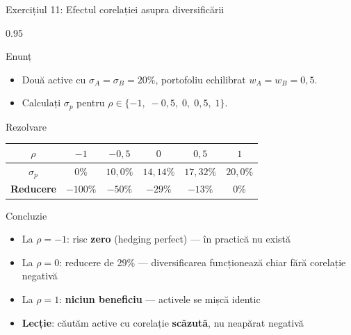 \documentclass[9pt, aspectratio=169, t]{beamer}
\begin{document}
\begin{frame}[shrink=10]{Exercițiul 11: Efectul corelației asupra diversificării}
    \begin{cminipage}{0.95\textwidth}
    \begin{block}{Enunț}
    \begin{itemize}\setlength{\itemsep}{0pt}
        \item Două active cu $\sigma_A = \sigma_B = 20\%$, portofoliu echilibrat $w_A = w_B = 0{,}5$.
        \item Calculați $\sigma_p$ pentru $\rho \in \{-1,\; -0{,}5,\; 0,\; 0{,}5,\; 1\}$.
    \end{itemize}
    \end{block}
    \vspace{0.1cm}
    \begin{exampleblock}{Rezolvare}
    \begin{center}
    {\small\renewcommand{\arraystretch}{1.2}
    \begin{tabular}{cccccc}
    \toprule
    $\rho$ & $-1$ & $-0{,}5$ & $0$ & $0{,}5$ & $1$ \\
    \midrule
    $\sigma_p$ & $0\%$ & $10{,}0\%$ & $14{,}14\%$ & $17{,}32\%$ & $20{,}0\%$ \\
    \textbf{Reducere} & $-100\%$ & $-50\%$ & $-29\%$ & $-13\%$ & $0\%$ \\
    \bottomrule
    \end{tabular}}
    \end{center}
    \end{exampleblock}
    \begin{alertblock}{Concluzie}
    \begin{itemize}\setlength{\itemsep}{0pt}
        \item La $\rho = -1$: risc \textbf{zero} (hedging perfect) --- în practică nu există
        \item La $\rho = 0$: reducere de 29\% --- diversificarea funcționează chiar fără corelație negativă
        \item La $\rho = 1$: \textbf{niciun beneficiu} --- activele se mișcă identic
        \item \textbf{Lecție}: căutăm active cu corelație \textbf{scăzută}, nu neapărat negativă
    \end{itemize}
    \end{alertblock}
    \end{cminipage}
\end{frame}
\end{document}
